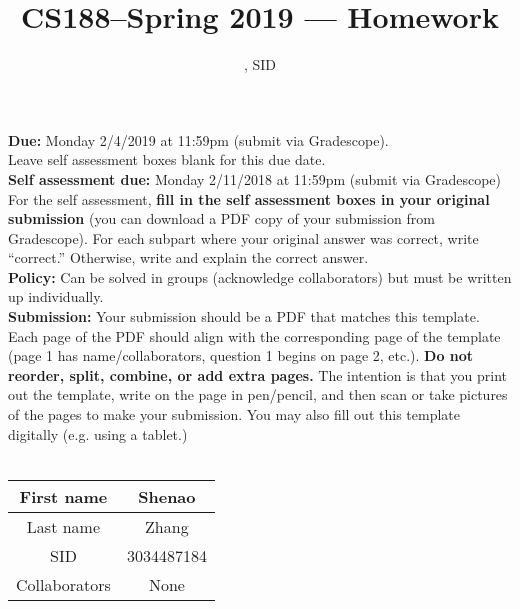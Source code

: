 \documentclass[11pt]{article}
\title{CS188--Spring 2019 --- Homework \Homework }
\author{\Name, SID \SID}
\date{}
\begin{document}
\maketitle

\noindent\textbf{Due:} Monday 2/4/2019 at 11:59pm (submit via Gradescope).\\
Leave self assessment boxes blank for this due date.\\
\textbf{Self assessment due:} Monday 2/11/2018 at 11:59pm (submit via Gradescope)
For the self assessment, \textbf{fill in the self assessment boxes in your original submission} (you can
download a PDF copy of your submission from Gradescope). For each subpart where your original answer
was correct, write “correct.” Otherwise, write and explain the correct answer.\\
\textbf{Policy:} Can be solved in groups (acknowledge collaborators) but must be written up individually.\\
\textbf{Submission:} Your submission should be a PDF that matches this template. Each page of the PDF should
align with the corresponding page of the template (page 1 has name/collaborators, question 1 begins on page
2, etc.). \textbf{Do not reorder, split, combine, or add extra pages. }The intention is that you print out the
template, write on the page in pen/pencil, and then scan or take pictures of the pages to make your submission.
You may also fill out this template digitally (e.g. using a tablet.)\\
\\
\begin{center}
\begin{tabular}{|c|c|}
\hline 
First name&Shenao\\
\hline 
Last name&Zhang\\
\hline 
SID&3034487184\\
\hline
Collaborators&None\\
\hline
\end{tabular}
\end{center}
\newpage
\end{document}
